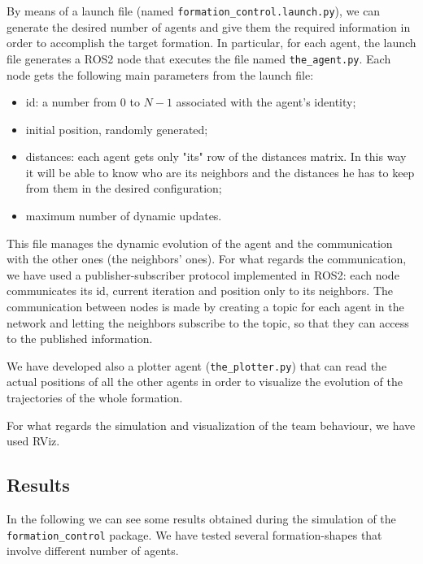 \documentclass[a4paper,11pt,oneside]{book}
\begin{document}
\bigskip
By means of a launch file (named \texttt{formation\_control.launch.py}), we can generate the desired number of agents and give them the required information in order to accomplish the target formation. In particular, for each agent, the launch file generates a ROS2 node that executes the file named \texttt{the\_agent.py}. Each node gets the following main parameters from the launch file:
\begin{itemize}
\item id: a number from $0$ to $N-1$ associated with the agent's identity;
\item initial position, randomly generated;
\item distances: each agent gets only "its" row of the distances matrix. In this way it will be able to know who are its neighbors and the distances he has to keep from them in the desired configuration;
\item maximum number of dynamic updates.
\end{itemize}
This file manages the dynamic evolution of the agent and the communication with the other ones (the neighbors' ones). For what regards the communication, we have used a publisher-subscriber protocol implemented in ROS2: each node communicates its id, current iteration and position only to its neighbors. 
The communication between nodes is made by creating a topic for each agent in the network and letting the neighbors subscribe to the topic, so that they can access to the published information.

\bigskip
We have developed also a plotter agent (\texttt{the\_plotter.py}) that can read the actual positions of all the other agents in order to visualize the evolution of the trajectories of the whole formation.

For what regards the simulation and visualization of the team behaviour, we have used RViz.

\subsection{Results}
In the following we can see some results obtained during the simulation of the \texttt{formation\_control} package. 
We have tested several formation-shapes that involve different number of agents.
\end{document}
